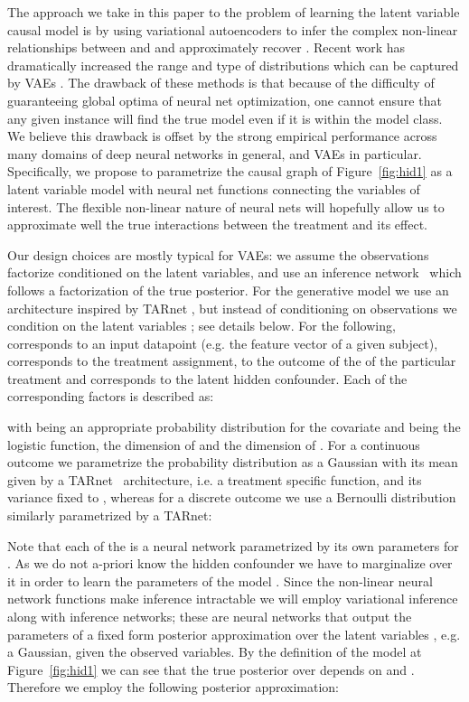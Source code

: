 \documentclass{article}
\begin{document}
The approach we take in this paper to the problem of learning the latent variable causal model is by using variational autoencoders \citep{kingma2013auto,rezende2014stochastic} to infer the complex non-linear relationships between  and  and approximately recover . Recent work has dramatically increased the range and type of distributions which can be captured by VAEs  \citep{tran2015variational,rezende2015variational,kingma2016improving}. The drawback of these methods is that because of the difficulty of guaranteeing global optima of neural net optimization, one cannot ensure that any given instance will find the true model even if it is within the model class. We believe this drawback is offset by the strong empirical performance across many domains of deep neural networks in general, and VAEs in particular. Specifically, we propose to parametrize the causal graph of Figure~\ref{fig:hid1} as a latent variable model with neural net functions connecting the variables of interest. The flexible non-linear nature of neural nets will hopefully allow us to approximate well the true interactions between the treatment and its effect.

Our design choices are mostly typical for VAEs: we assume the observations factorize conditioned on the latent variables, and use an inference network~\citep{kingma2013auto,rezende2014stochastic} which follows a factorization of the true posterior. For the generative model we use an architecture inspired by TARnet \citep{shalit2016estimating}, but instead of conditioning on observations we condition on the latent variables ; see details below.
For the following,  corresponds to an input datapoint (e.g. the feature vector of a given subject),  corresponds to the treatment assignment,  to the outcome of the of the particular treatment and  corresponds to the latent hidden confounder. Each of the corresponding factors is described as:

with  being an appropriate probability distribution for the covariate  and  being the logistic function,  the dimension of  and  the dimension of . For a continuous outcome we parametrize the probability distribution as a Gaussian with its mean given by a TARnet~\citep{shalit2016estimating} architecture, i.e. a treatment specific function, and its variance fixed to , whereas for a discrete outcome we use a Bernoulli distribution similarly parametrized by a TARnet:

Note that each of the  is a neural network parametrized by its own parameters  for . As we do not a-priori know the hidden confounder  we have to marginalize over it in order to learn the parameters of the model . Since the non-linear neural network functions make inference intractable we will employ variational inference along with inference networks; these are neural networks that output the parameters of a fixed form posterior approximation over the latent variables , e.g. a Gaussian, given the observed variables. By the definition of the model at Figure~\ref{fig:hid1} we can see that the true posterior over  depends on  and . Therefore we employ the following posterior approximation:
\end{document}

